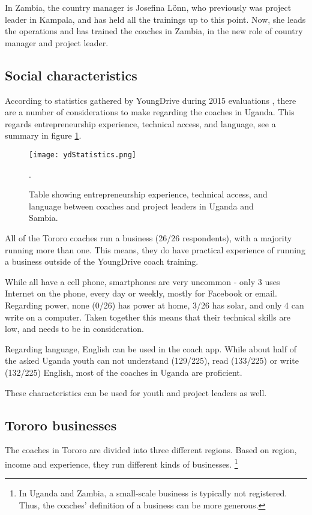 In Zambia, the country manager is Josefina Lönn, who previously was project leader in Kampala, and has held all the trainings up to this point. Now, she leads the operations and has trained the coaches in Zambia, in the new role of country manager and project leader.

\subsection{Social characteristics}

According to statistics gathered by YoungDrive during 2015 evaluations \citep{youngdrive-statistics}, there are a number of considerations to make regarding the coaches in Uganda. This regards entrepreneurship experience, technical access, and language, see a summary in figure \ref{fig:ydStatistics}.

\begin{figure}[h]
    \centering
    \texttt{[image: ydStatistics.png]}
    \caption{Table showing entrepreneurship experience, technical access, and language between coaches and project leaders in Uganda and Sambia.}.
    \label{fig:ydStatistics}
\end{figure}

All of the Tororo coaches run a business (26/26 respondents), with a majority running more than one. This means, they do have practical experience of running a business outside of the YoungDrive coach training.

While all have a cell phone, smartphones are very uncommon - only 3 uses Internet on the phone, every day or weekly, mostly for Facebook or email. Regarding power, none (0/26) has power at home, 3/26 has solar, and only 4 can write on a computer. Taken together this means that their technical skills are low, and needs to be in consideration.

Regarding language, English can be used in the coach app. While about half of the asked Uganda youth can not understand (129/225), read (133/225) or write (132/225) English, most of the coaches in Uganda are proficient.

These characteristics can be used for youth and project leaders as well.

\subsection{Tororo businesses}

The coaches in Tororo are divided into three different regions. Based on region, income and experience, they run different kinds of businesses. \footnote{In Uganda and Zambia, a small-scale business is typically not registered. Thus, the coaches' definition of a business can be more generous.}

